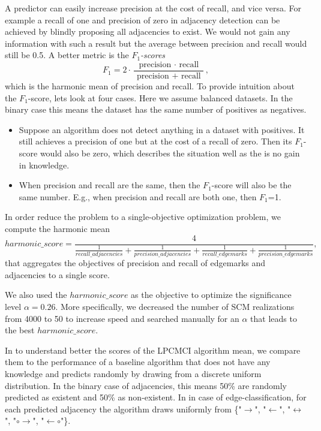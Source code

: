 \documentclass[conference]{IEEEtran}
\begin{document}
A predictor can easily increase precision at the cost of recall, and vice versa. For example a recall of one and precision of zero in adjacency detection can be achieved by blindly proposing all adjacencies to exist. We would not gain any information with such a result but the average between precision and recall would still be 0.5. A better metric is the \textit{$F_1$-scores}
\begin{equation}
F_{1}=2 \cdot \frac{\text { precision } \cdot \text { recall }}{\text { precision }+\text { recall }},
\end{equation}
which is the harmonic mean of precision and recall.
To provide intuition about the $F_1$-score, lets look at four cases. Here we assume balanced datasets. In the binary case this means the dataset has the same number of positives as negatives. 
\begin{itemize}
    \item Suppose an algorithm does not detect anything in a dataset with positives. It still achieves a precision of one but at the cost of a recall of zero. Then its $F_1$-score would also be zero, which describes the situation well as the is no gain in knowledge.
    \item When precision and recall are the same, then the $F_1$-score will also be the same number. E.g., when precision and recall are both one, then $F_1$=1.
\end{itemize}

In order reduce the problem to a single-objective optimization problem, we compute the harmonic mean
\begin{equation}
harmonic\_score=\frac{4}{\frac{1}{recall\_adjacencies}+\frac{1}{precision\_adjacencies}+\frac{1}{recall\_edgemarks}+\frac{1}{precision\_edgemarks}},
\label{eq:harmonicscore}
\end{equation}
that aggregates the objectives of precision and recall of edgemarks and adjacencies to a single score.

We also used the $harmonic\_score$ as the objective to optimize the significance level $\alpha=0.26$. More specifically, we decreased the number of SCM realizations from 4000 to 50 to increase speed and searched manually for an $\alpha$ that leads to the best $harmonic\_score$.

In to understand better the scores of the LPCMCI algorithm mean, we compare them to the performance of a baseline algorithm that does not have any knowledge and predicts randomly by drawing from a discrete uniform distribution.
In the binary case of adjacencies, this means 50\% are randomly predicted as existent and 50\% as non-existent.
In in case of edge-classification, for each predicted adjacency the algorithm draws uniformly from  \{"$\rightarrow$", "$\leftarrow$", "$\leftrightarrow$", "$\circ$$\rightarrow$", "$\leftarrow$$\circ$"\}.
\end{document}
